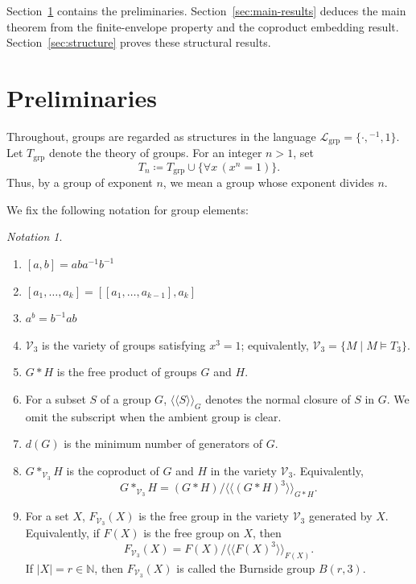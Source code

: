 \documentclass[11pt,reqno]{article}
\theoremstyle{definition}
\theoremstyle{remark}
\newtheorem{notation}[theorem]{Notation}
\newcommand{\llangle}{\langle\!\langle}
\newcommand{\rrangle}{\rangle\!\rangle}
\begin{document}
Section~\ref{sec:preliminaries} contains the preliminaries.
Section~\ref{sec:main-results} deduces the main theorem from the
finite-envelope property and the coproduct embedding result.
Section~\ref{sec:structure} proves these structural results.

\section{Preliminaries}
\label{sec:preliminaries}

Throughout, groups are regarded as structures in the language
$\mathcal{L}_{\mathrm{grp}}=\{\cdot,{}^{-1},1\}$.  Let
$T_{\mathrm{grp}}$ denote the theory of groups.  For an integer $n>1$, set
\[
T_n \coloneqq T_{\mathrm{grp}} \cup \{\forall x\,(x^n=1)\}.
\]
Thus, by a group of exponent $n$, we mean a group whose exponent divides $n$.

We fix the following notation for group elements:
\begin{notation}
    \begin{enumerate}
        \item $[a,b]=aba^{-1}b^{-1}$
        \item $[a_1,\ldots,a_k]=[[a_1,\ldots,a_{k-1}],a_k]$
        \item $a^b=b^{-1}ab$
        \item $\mathcal V_3$ is the variety of groups satisfying $x^3=1$; equivalently, $\mathcal V_3=\{M\mid M\models T_3\}$.
        \item $G*H$ is the free product of groups $G$ and $H$.
        \item For a subset $S$ of a group $G$, $\llangle S\rrangle_G$ denotes
        the normal closure of $S$ in $G$.  We omit the subscript when the
        ambient group is clear.
        \item $d(G)$ is the minimum number of generators of $G$. 
        \item $G*_{\mathcal V_3}H$ is the coproduct of $G$ and $H$ in the
        variety $\mathcal V_3$.  Equivalently,
        \[
        G*_{\mathcal V_3}H
        = (G*H)/\llangle (G*H)^3\rrangle_{G*H}.
        \]
        \item For a set $X$, $F_{\mathcal V_3}(X)$ is the free group in the
        variety $\mathcal V_3$ generated by $X$.  Equivalently, if $F(X)$ is
        the free group on $X$, then
        \[
        F_{\mathcal V_3}(X)
        =F(X)/\llangle F(X)^3\rrangle_{F(X)}.
        \]
        If $|X|=r\in\mathbb N$, then $F_{\mathcal V_3}(X)$ is called the
        Burnside group $B(r,3)$.
    \end{enumerate}
\end{notation}
\end{document}
